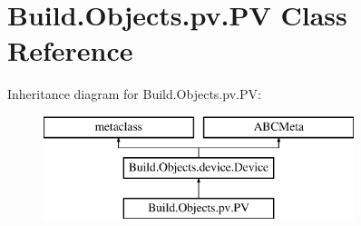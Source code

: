 \hypertarget{class_build_1_1_objects_1_1pv_1_1_p_v}{}\section{Build.\+Objects.\+pv.\+PV Class Reference}
\label{class_build_1_1_objects_1_1pv_1_1_p_v}
Inheritance diagram for Build.\+Objects.\+pv.\+PV\+:\begin{figure}[H]
\begin{center}
\leavevmode
\includegraphics[height=3.000000cm]{class_build_1_1_objects_1_1pv_1_1_p_v}
\end{center}
\end{figure}
